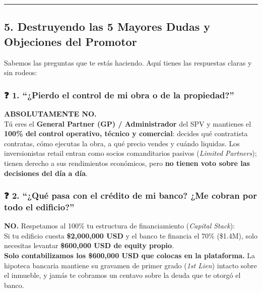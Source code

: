\documentclass[
]{article}
\renewenvironment{quote}{%
  \vspace{0.4em}
  \begin{tcolorbox}[
    colback=bridsLight,
    colframe=bridsBlue,
    arc=2mm,
    boxrule=1.2pt,
    left=10pt,
    right=10pt,
    top=8pt,
    bottom=8pt,
    before skip=6pt,
    after skip=8pt
  ]%
}{%
  \end{tcolorbox}%
}
\begin{document}
\begin{center}\rule{0.5\linewidth}{0.5pt}\end{center}

\subsection{5. Destruyendo las 5 Mayores Dudas y Objeciones del
Promotor}\label{destruyendo-las-5-mayores-dudas-y-objeciones-del-promotor}

Sabemos las preguntas que te estás haciendo. Aquí tienes las respuestas
claras y sin rodeos:

\subsubsection{❓ 1. ``¿Pierdo el control de mi obra o de la
propiedad?''}\label{pierdo-el-control-de-mi-obra-o-de-la-propiedad}

\begin{quote}
\textbf{ABSOLUTAMENTE NO.}\\
Tú eres el \textbf{General Partner (GP) / Administrador} del SPV y
mantienes el \textbf{100\% del control operativo, técnico y comercial}:
decides qué contratista contratas, cómo ejecutas la obra, a qué precio
vendes y cuándo liquidas. Los inversionistas retail entran como socios
comanditarios pasivos (\emph{Limited Partners}); tienen derecho a sus
rendimientos económicos, pero \textbf{no tienen voto sobre las
decisiones del día a día}.
\end{quote}

\subsubsection{❓ 2. ``¿Qué pasa con el crédito de mi banco? ¿Me cobran
por todo el
edificio?''}\label{quuxe9-pasa-con-el-cruxe9dito-de-mi-banco-me-cobran-por-todo-el-edificio}

\begin{quote}
\textbf{NO.} Respetamos al 100\% tu estructura de financiamiento
(\emph{Capital Stack}):\\
Si tu edificio cuesta \textbf{\$2,000,000 USD} y el banco te financia el
70\% (\$1.4M), solo necesitas levantar \textbf{\$600,000 USD de equity
propio}.\\
\textbf{Solo contabilizamos los \$600,000 USD que colocas en la
plataforma.} La hipoteca bancaria mantiene su gravamen de primer grado
(\emph{1st Lien}) intacto sobre el inmueble, y jamás te cobramos un
centavo sobre la deuda que te otorgó el banco.
\end{quote}
\end{document}
